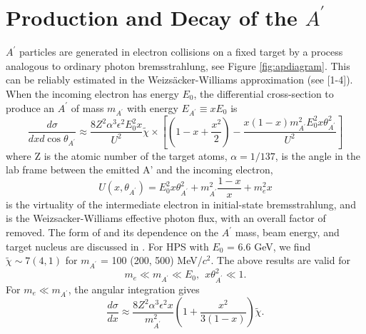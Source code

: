\section{Production and Decay of the $A^\prime$}
\label{app:ProdAndDecay}

\def \ap {A^\prime}
\def \map {m_{A^\prime}}
\def \thap {\theta_{A^\prime}}


$\ap$ particles are generated in electron collisions on a fixed target by a process analogous to ordinary photon bremsstrahlung, see Figure \ref{fig:apdiagram}.  This can be reliably estimated in the Weizsäcker-Williams approximation (see [1-4]).  When the incoming electron has energy $E_0$, the differential cross-section to produce an $\ap$ of mass $m_{\ap}$ with energy $E_{\ap}\equiv x E_0$ is 
\begin{equation}
\frac{d\sigma}{dxd\cos{\theta_{\ap}}}\approx \frac{8Z^2\alpha^3\epsilon^2 E_0^2 x}{U^2}\tilde{\chi}\times\left[\left(1-x+\frac{x^2}{2}\right)-\frac{x(1-x)m_{\ap}^2E_0^2x\theta_{\ap}^2}{U^2}\right]
\end{equation}
where Z is the atomic number of the target atoms, $\alpha = 1/137$,  is the angle in the lab frame between the emitted A' and the incoming electron, 
\begin{equation}
U(x,\theta_{\ap})=E_0^2x\theta_{\ap}^2+m_{\ap}^2\frac{1-x}{x}+m_e^2x
\label{eq:u}
\end{equation}
is the virtuality of the intermediate electron in initial-state bremsstrahlung, and  is the Weizsacker-Williams effective photon flux, with an overall factor of  removed.  The form of  and its dependence on the $\ap$ mass, beam energy, and target nucleus are discussed in \cite{Kim:1973he}.  For HPS with $E_0$ = 6.6 GeV, we find $\tilde{\chi}\sim 7 (4, 1)$ for $m_{\ap}$ = 100 (200, 500) MeV/$c^2$.
The above results are valid for 
\begin{equation}
m_e\ll m_{\ap}\ll E_0  , ~~ x\theta_{\ap}^2\ll 1.
\end{equation}
For $m_e\ll m_{\ap}$, the angular integration gives
\begin{equation}
\frac{d\sigma}{dx}\approx \frac{8Z^2\alpha^3\epsilon^2 x}{m_{\ap}^2}\left(1+\frac{x^2}{3(1-x)}\right)\tilde{\chi} .
\end{equation}

